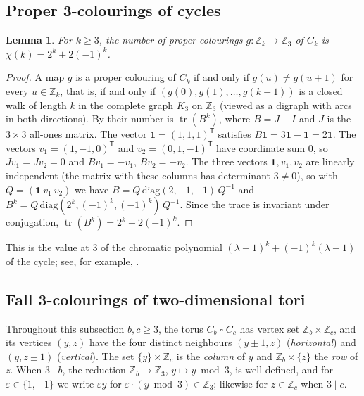\documentclass[11pt]{article}
\theoremstyle{plain}
\newtheorem{lemma}[lemma]{Lemma}
\theoremstyle{definition}
\theoremstyle{remark}
\newcommand{\Z}{\mathbb{Z}}
\newcommand{\T}{\mathbin{\square}}
\DeclareMathOperator{\tr}{tr}
\begin{document}
\subsection{Proper 3-colourings of cycles}

\begin{lemma}\label{lem:cycle-colourings}
For $k \ge 3$, the number of proper colourings $g : \Z_k \to \Z_3$ of $C_k$ is
$\chi(k) = 2^k + 2(-1)^k$.
\end{lemma}

\begin{proof}
A map $g$ is a proper colouring of $C_k$ if and only if $g(u) \ne g(u+1)$ for every
$u \in \Z_k$, that is, if and only if $(g(0), g(1), \dots, g(k-1))$ is a closed walk of length
$k$ in the complete graph $K_3$ on $\Z_3$ (viewed as a digraph with arcs in both directions).
By  their number is $\tr(B^k)$, where $B = J - I$ and $J$ is the $3 \times 3$
all-ones matrix. The vector $\mathbf{1} = (1,1,1)^{\mathsf T}$ satisfies
$B\mathbf{1} = 3\mathbf{1} - \mathbf{1} = 2\mathbf{1}$. The vectors
$v_1 = (1, -1, 0)^{\mathsf T}$ and $v_2 = (0, 1, -1)^{\mathsf T}$ have coordinate sum $0$, so
$Jv_1 = Jv_2 = 0$ and $Bv_1 = -v_1$, $Bv_2 = -v_2$. The three vectors
$\mathbf{1}, v_1, v_2$ are linearly independent (the matrix with these columns has determinant
$3 \ne 0$), so with $Q = (\mathbf{1}\ v_1\ v_2)$ we have
$B = Q\,\mathrm{diag}(2, -1, -1)\,Q^{-1}$ and $B^k = Q\,\mathrm{diag}(2^k, (-1)^k, (-1)^k)\,
Q^{-1}$. Since the trace is invariant under conjugation,
$\tr(B^k) = 2^k + 2(-1)^k$.
\end{proof}

This is the value at $3$ of the chromatic polynomial $(\lambda - 1)^k + (-1)^k(\lambda - 1)$ of
the cycle; see, for example, \cite{DKT2005}.

\subsection{Fall 3-colourings of two-dimensional tori}

Throughout this subsection $b, c \ge 3$, the torus $C_b \T C_c$ has vertex set
$\Z_b \times \Z_c$, and its vertices $(y,z)$ have the four distinct neighbours
$(y \pm 1, z)$ (\emph{horizontal}) and $(y, z \pm 1)$ (\emph{vertical}). The set
$\{y\} \times \Z_c$ is the \emph{column} of $y$ and $\Z_b \times \{z\}$ the \emph{row} of
$z$. When $3 \mid b$, the reduction $\Z_b \to \Z_3$, $y \mapsto y \bmod 3$, is well defined,
and for $\varepsilon \in \{1, -1\}$ we write $\varepsilon y$ for $\varepsilon \cdot (y \bmod 3)
\in \Z_3$; likewise for $z \in \Z_c$ when $3 \mid c$.
\end{document}

